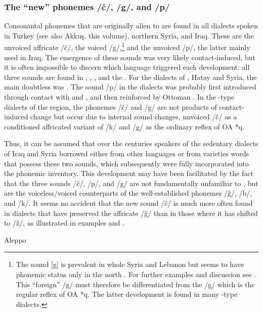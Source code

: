 \documentclass[output=paper]{langsci/langscibook}
\begin{document}
  \subsubsection{The “new” phonemes /č/, /g/, and /p/} 

Consonantal phonemes that are originally alien to  are found in all  dialects spoken in Turkey (see also Akkuş, this volume), northern Syria, and Iraq. These are the unvoiced affricate /č/, the voiced /g/,\footnote{The sound [g] is prevalent in whole Syria and Lebanon but seems to have phonemic status only in the north \citep[26]{Sabuni1980}. For further examples and discussion see \citet{Ferguson1969}. This “foreign” /g/ must therefore be differentiated from the /g/ which is the regular reflex of OA *q. The latter development is found in many -type dialects.} and the unvoiced /p/, the latter mainly used in Iraq. The emergence of these sounds was very likely contact-induced, but it is often impossible to discern which language triggered each development: all three sounds are found in , , , and the . For the dialects of , Hatay and Syria, the main  doubtless was . The sound /p/ in the  dialects was probably first introduced through contact with  and , and then reinforced by Ottoman . In the -type dialects of the region, the phonemes /č/ and /g/ are not products of contact-induced change but occur due to internal sound changes, unvoiced /č/ as a conditioned affricated variant of /k/ and /g/ as the ordinary reflex of OA *q. 

Thus, it can be assumed that over the centuries speakers of the sedentary dialects of Iraq and Syria borrowed either from other languages or from   varieties words that possess these two sounds, which subsequently were fully incorporated into the phonemic inventory. This development may have been facilitated by the fact that the three sounds /č/, /p/, and /g/ are not fundamentally unfamiliar to , but are the voiceless/voiced counterparts of the well-established phonemes /ǧ/, /b/, and /k/. It seems no accident that the new sound /č/ is much more often found in dialects that have preserved the affricate /ǧ/ than in those where it has shifted to /ž/, as illustrated in examples  and .

\ea\label{Aleppo}
Aleppo \citep[205--210]{Sabuni1980}
\end{document}
